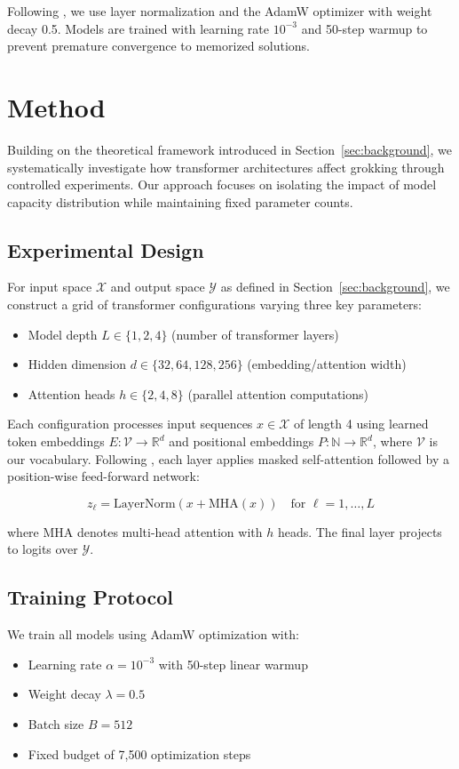 \documentclass{article} %
\begin{document}
Following \citet{ba2016layer}, we use layer normalization and the AdamW optimizer \citep{loshchilov2017adamw} with weight decay 0.5. Models are trained with learning rate $10^{-3}$ and 50-step warmup to prevent premature convergence to memorized solutions.

\section{Method}
\label{sec:method}

Building on the theoretical framework introduced in Section~\ref{sec:background}, we systematically investigate how transformer architectures affect grokking through controlled experiments. Our approach focuses on isolating the impact of model capacity distribution while maintaining fixed parameter counts.

\subsection{Experimental Design}
For input space $\mathcal{X}$ and output space $\mathcal{Y}$ as defined in Section~\ref{sec:background}, we construct a grid of transformer configurations varying three key parameters:
\begin{itemize}
    \item Model depth $L \in \{1,2,4\}$ (number of transformer layers)
    \item Hidden dimension $d \in \{32,64,128,256\}$ (embedding/attention width)
    \item Attention heads $h \in \{2,4,8\}$ (parallel attention computations)
\end{itemize}

Each configuration processes input sequences $x \in \mathcal{X}$ of length 4 using learned token embeddings $E: \mathcal{V} \rightarrow \mathbb{R}^d$ and positional embeddings $P: \mathbb{N} \rightarrow \mathbb{R}^d$, where $\mathcal{V}$ is our vocabulary. Following \citet{vaswani2017attention}, each layer applies masked self-attention followed by a position-wise feed-forward network:

\begin{equation}
    z_\ell = \text{LayerNorm}(x + \text{MHA}(x)) \quad \text{for } \ell = 1,\ldots,L
\end{equation}

where MHA denotes multi-head attention with $h$ heads. The final layer projects to logits over $\mathcal{Y}$.

\subsection{Training Protocol}
We train all models using AdamW optimization \citep{loshchilov2017adamw} with:
\begin{itemize}
    \item Learning rate $\alpha = 10^{-3}$ with 50-step linear warmup
    \item Weight decay $\lambda = 0.5$
    \item Batch size $B = 512$
    \item Fixed budget of 7,500 optimization steps
\end{itemize}
\end{document}
